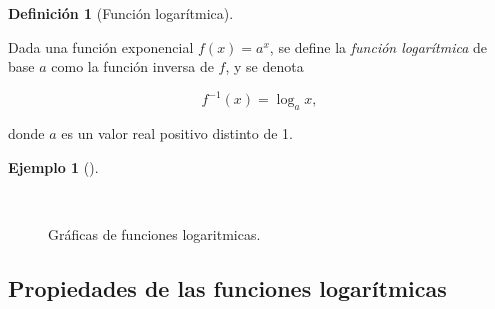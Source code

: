 \documentclass[
  a4paper,
]{scrreport}
\theoremstyle{plain}
\theoremstyle{plain}
\theoremstyle{definition}
\newtheorem{definition}{Definición}[chapter]
\theoremstyle{plain}
\theoremstyle{definition}
\newtheorem{example}{Ejemplo}[chapter]
\theoremstyle{remark}
\begin{document}
\leavevmode{}%
\begin{definition}[Función logarítmica]\label{def-funcion-logaritmica}

Dada una función exponencial \(f(x)=a^x\), se define la \emph{función
logarítmica} de base \(a\) como la función inversa de \(f\), y se denota

\[f^{-1}(x)=\log_a x,\]

donde \(a\) es un valor real positivo distinto de 1.

\end{definition}

\leavevmode{}%
\begin{example}[]\label{exm-funcion-logaritmica}

~

\begin{figure}

{\centering 



}

\caption{Gráficas de funciones logaritmicas.}

\end{figure}

\end{example}

\hypertarget{propiedades-de-las-funciones-logaruxedtmicas}{%
\subsection{Propiedades de las funciones
logarítmicas}\label{propiedades-de-las-funciones-logaruxedtmicas}}
\end{document}
